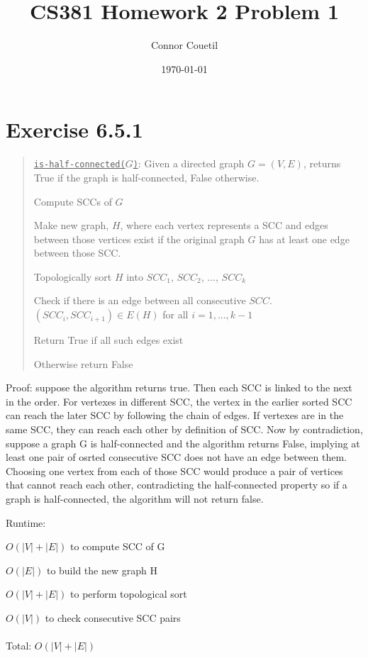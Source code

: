 \documentclass[letterpaper,11pt]{article}
\title{CS381 Homework 2 Problem 1}
\author{Connor Couetil}
\date{\today}
\begin{document}
\maketitle

\section{Exercise 6.5.1}

\begin{quote}
    \noindent\texttt{\underline{is-half-connected($G$)}}: Given a directed graph $G=(V,E)$, returns True if the graph is half-connected, False otherwise.
    \begin{steps}
        \item Compute SCCs of $G$
        \item Make new graph, $H$, where each vertex represents a SCC and edges
        between those vertices exist if the original graph $G$ has at least one
        edge between those SCC.
        \item Topologically sort $H$ into $SCC_1$, $SCC_2$, ..., $SCC_k$
        \item Check if there is an edge between all consecutive $SCC$.
            \\
            $(SCC_i, SCC_{i+1}) \in E(H)$ for all $i = 1, ..., k - 1$
        \item Return True if all such edges exist
        \item Otherwise return False
    \end{steps}
\end{quote}

Proof: suppose the algorithm returns true. Then each SCC is linked to the next
in the order. For vertexes in different SCC, the vertex in the earlier sorted
SCC can reach the later SCC by following the chain of edges. If vertexes are in
the same SCC, they can reach each other by definition of SCC. Now by
contradiction, suppose a graph G is half-connected and the algorithm returns
False, implying at least one pair of osrted consecutive SCC does not have an
edge between them. Choosing one vertex from each of those SCC would produce a
pair of vertices that cannot reach each other, contradicting the half-connected
property so if a graph is half-connected, the algorithm will not return false.


Runtime:
\begin{steps}
    \item $O(|V| + |E|)$ to compute SCC of G
    \item $O(|E|)$ to build the new graph H
    \item $O(|V| + |E|)$ to perform topological sort
    \item $O(|V|)$ to check consecutive SCC pairs
    \\
    \\
    Total: $O(|V| + |E|)$ 
\end{steps}
\end{document}
